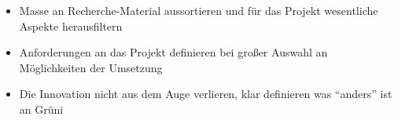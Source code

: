 \begin{itemize}
\tightlist
\item
  Masse an Recherche-Material aussortieren und für das Projekt
  wesentliche Aspekte herausfiltern
\item
  Anforderungen an das Projekt definieren bei großer Auswahl an
  Möglichkeiten der Umsetzung
\item
  Die Innovation nicht aus dem Auge verlieren, klar definieren was
  ``anders'' ist an Grüni
\end{itemize}
